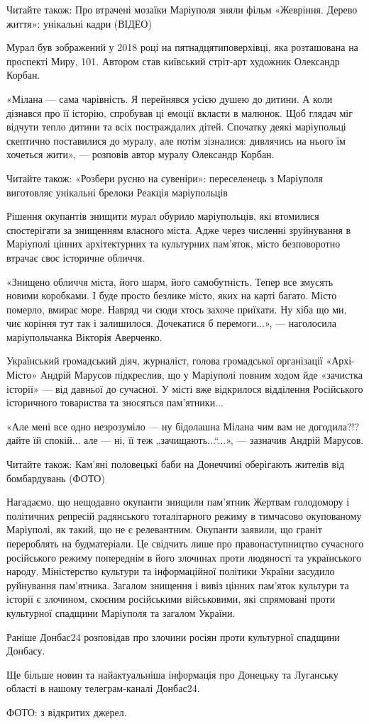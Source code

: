 Читайте також: Про втрачені мозаїки Маріуполя зняли фільм «Жевріння. Дерево
життя»: унікальні кадри (ВІДЕО)

Мурал був зображений у 2018 році на пятнадцятиповерхівці, яка розташована на
проспекті Миру, 101. Автором став київський стріт-арт художник Олександр
Корбан.

«Мілана — сама чарівність. Я перейнявся усією душею до дитини. А коли дізнався
про її історію, спробував ці емоції вкласти в малюнок. Щоб глядач міг відчути
тепло дитини та всіх постраждалих дітей. Спочатку деякі маріупольці скептично
поставилися до муралу, але потім зізналися: дивлячись на нього їм хочеться
жити», — розповів автор муралу Олександр Корбан.


Читайте також: «Розбери русню на сувеніри»: переселенець з Маріуполя виготовляє унікальні брелоки
Реакція маріупольців

Рішення окупантів знищити мурал обурило маріупольців, які втомилися спостерігати за знищенням власного міста. Адже через численні зруйнування в Маріуполі цінних архітектурних та культурних пам'яток, місто безповоротно втрачає своє історичне обличчя.

«Знищено обличчя міста, його шарм, його самобутність. Тепер все змусять новими коробками. І буде просто безлике місто, яких на карті багато. Місто померло, вмирає море. Навряд чи сюди хтось захоче приїхати. Ну хіба що ми, чиє коріння тут так і залишилося. Дочекатися б перемоги...», — наголосила маріупольчанка Вікторія Аверченко.

Український громадський діяч, журналіст, голова громадської організації «Архі-Місто» Андрій Марусов підкреслив, що у Маріуполі повним ходом йде «зачистка історії» — від давньої до сучасної. У місті вже відкрилося відділення Російського історичного товариства та зносяться пам'ятники...


«Але мені все одно незрозуміло — ну бідолашна Мілана чим вам не догодила?!?
дайте їй спокій... але — ні, її теж „зачищають...“...», — зазначив Андрій Марусов.

Читайте також: Кам'яні половецькі баби на Донеччині оберігають жителів від
бомбардувань (ФОТО)

Нагадаємо, що нещодавно окупанти знищили пам'ятник Жертвам голодомору і політичних репресій радянського тоталітарного режиму в тимчасово окупованому Маріуполі, як такий, що не є релевантним. Окупанти заявили, що граніт перероблять на будматеріали. Це свідчить лише про правонаступництво сучасного російського режиму попереднім в його злочинах проти людяності та українського народу. Міністерство культури та інформаційної політики України засудило руйнування пам'ятника. Загалом знищення і вивіз цінних пам'яток культури та історії є злочином, скоєним російськими військовими, які спрямовані проти культурної спадщини Маріуполя та загалом України.

Раніше Донбас24 розповідав про злочини росіян проти культурної спадщини Донбасу.

Ще більше новин та найактуальніша інформація про Донецьку та Луганську області в нашому телеграм-каналі Донбас24.

ФОТО: з відкритих джерел.
